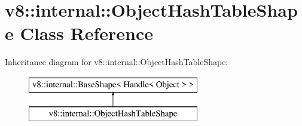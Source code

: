 \hypertarget{classv8_1_1internal_1_1_object_hash_table_shape}{}\section{v8\+:\+:internal\+:\+:Object\+Hash\+Table\+Shape Class Reference}
\label{classv8_1_1internal_1_1_object_hash_table_shape}
Inheritance diagram for v8\+:\+:internal\+:\+:Object\+Hash\+Table\+Shape\+:\begin{figure}[H]
\begin{center}
\leavevmode
\includegraphics[height=2.000000cm]{classv8_1_1internal_1_1_object_hash_table_shape}
\end{center}
\end{figure}
